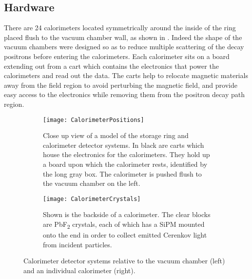 \subsection{Hardware}


There are 24 calorimeters located symmetrically around the inside of the ring placed flush to the vacuum chamber wall, as shown in . Indeed the shape of the vacuum chambers were designed so as to reduce multiple scattering of the decay positrons before entering the calorimeters. Each calorimeter sits on a board extending out from a cart which contains the electronics that power the calorimeters and read out the data. The carts help to relocate magnetic materials away from the field region to avoid perturbing the magnetic field, and provide easy access to the electronics while removing them from the positron decay path region.


\begin{figure}
\centering
    \begin{subfigure}[t]{0.43\textwidth}
        \centering
        \texttt{[image: CalorimeterPositions]}
        \caption{Close up view of a model of the storage ring and calorimeter detector systems. In black are carts which house the electronics for the calorimeters. They hold up a board upon which the calorimeter rests, identified by the long gray box. The calorimeter is pushed flush to the vacuum chamber on the left.}
    \label{fig:CalorimeterPositions}
    \end{subfigure}%
    \hspace{5mm}
    \begin{subfigure}[t]{0.47\textwidth}
        \centering
        \texttt{[image: CalorimeterCrystals]}
        \caption{Shown is the backside of a calorimeter. The clear blocks are PbF\textsubscript{2} crystals, each of which has a SiPM mounted onto the end in order to collect emitted Cerenkov light from incident particles.}
    \label{fig:CalorimeterCrystals}
    \end{subfigure}
\caption[Calorimeters]{Calorimeter detector systems relative to the vacuum chamber (left) and an individual calorimeter (right).}
\label{fig:calos}
\end{figure}


